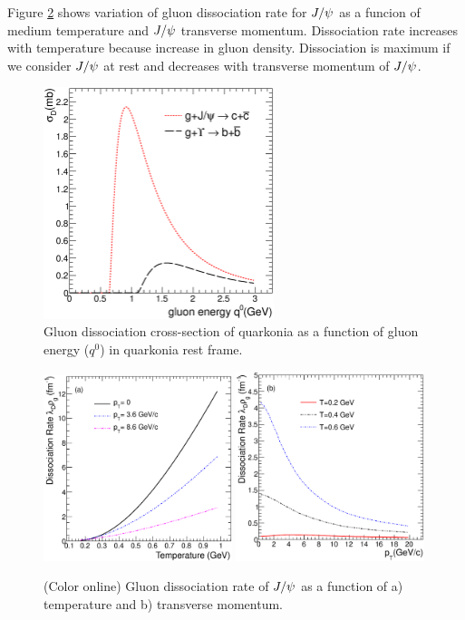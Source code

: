 \documentclass[aps,prc,preprint,superscriptaddress,showpacs,showkeys]{revtex4-1}
\begin{document}
 Figure \ref{fig:DRateVsTempAndPt} shows variation of gluon dissociation rate for $J/\psi$ as a 
funcion of medium temperature and $J/\psi$ transverse momentum. Dissociation rate increases with temperature because 
increase in gluon density. Dissociation is maximum if we consider $J/\psi$ at rest and decreases 
with transverse momentum of $J/\psi$.


\begin{figure}
\includegraphics[width=0.60\textwidth]{Fig2_SigmaDq0.eps}
\caption{Gluon dissociation cross-section of quarkonia as a function of gluon energy ($q^{0}$) in
quarkonia rest frame.}
\label{fig:SigmaDQ0}
\end{figure}

\begin{figure}
\includegraphics[width=0.49\textwidth]{Fig3a_DRateVsT.eps}
\includegraphics[width=0.49\textwidth]{Fig3b_DRateVsPt.eps}
\caption{(Color online) Gluon dissociation rate of $J/\psi$ as a function of a) temperature and  b) transverse momentum.}
\label{fig:DRateVsTempAndPt}
\end{figure}
\end{document}

